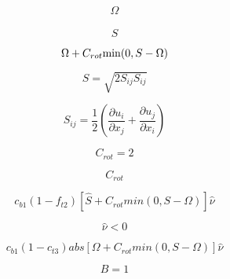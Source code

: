 

\begin{equation}
\Omega
\end{equation}

\begin{equation}
\hat S
\end{equation}

\begin{equation}
\Omega + C_{rot} {\rm min}(0, S - \Omega)
\end{equation}

\begin{equation}
S=\sqrt{2 S_{ij} S_{ij} }
\end{equation}

\begin{equation}
S_{ij} = \frac{1}{2} \left(\frac{\partial u_i}{\partial x_j} +
   \frac{\partial u_j}{\partial x_i} \right)
\end{equation}

\begin{equation}
C_{rot} = 2
\end{equation}

\begin{equation}
C_{rot}
\end{equation}

\begin{equation}
c_{b1}(1-f_{t2})[\hat S + C_{rot} min(0,S - \Omega)]\hat \nu
\end{equation}

\begin{equation}
\hat{\nu} < 0
\end{equation}

\begin{equation}
c_{b1} (1-c_{t3}) abs[ \Omega+C_{rot} min(0,S-\Omega) ]\hat{\nu}
\end{equation}

\begin{equation}
B=1
\end{equation}


